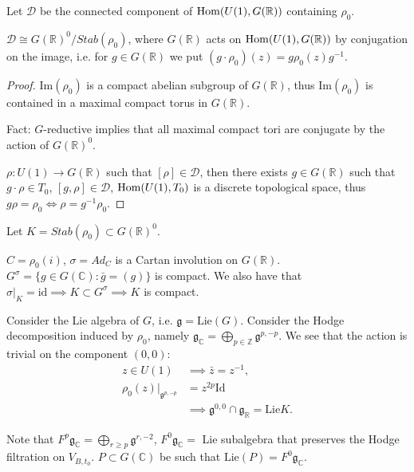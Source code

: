 \begin{definition}
\label{definition-connected-component}
Let $\mathcal{D}$ be the connected component
of
$\mathop{\mathrm{Hom}}\nolimits(U(1),G(\mathbb{R}))$ containing
$\rho_0$.
\end{definition}

\begin{lemma}
\label{lemma-d-orbit}
$\mathcal{D} \cong
G(\mathbb{R})^0/Stab(\rho_0)$,
where $G(\mathbb{R})$ acts on
$\mathop{\mathrm{Hom}}\nolimits(U(1),G(\mathbb{R}))$ by conjugation on
the image,
i.e. for $g \in G(\mathbb{R})$ we put
$(g\cdot \rho_0)(z)=g\rho_0(z)g^{-1}$.
\end{lemma}

\begin{proof}
$\text{Im}(\rho_0)$ is a compact abelian
subgroup
of $G(\mathbb{R})$, thus $\text{Im}(\rho_0)$
is contained in a
maximal compact torus in $G(\mathbb{R})$.

Fact: $G$-reductive implies that all maximal
compact
tori are conjugate by the action of
$G(\mathbb{R})^0$.

$\rho:U(1) \to G(\mathbb{R})$ such that
$[\rho] \in \mathcal{D}$,
then there exists $g \in G(\mathbb{R})$ such
that
$g\cdot\rho \in T_0$,
$[g,\rho]\in \mathcal{D}$,
$\mathop{\mathrm{Hom}}\nolimits(U(1),T_0)$ is a discrete topological
space,
thus $g\rho=\rho_0 \iff \rho=g^{-1}\rho_0$.
\end{proof}

\medskip\noindent
Let $K=Stab(\rho_0)\subset G(\mathbb{R})^0$.

$C=\rho_0(i)$, $\sigma=Ad_C$
is a Cartan involution on $G(\mathbb{R})$.
$G^\sigma = \{g \in
G(\mathbb{C}):\bar{g}=(g)\}$
is compact.
We also have that $\sigma|_K=\text{id}
\implies K\subset G^\sigma
\implies K$ is compact.

Consider the Lie algebra of $G$, i.e.
$\mathfrak{g}=\text{Lie}(G)$.
Consider the Hodge decomposition induced by
$\rho_0$, namely
$\mathfrak{g}_\mathbb{C}=\bigoplus_{p \in
\mathbb{Z}}\mathfrak{g}^{p,-p}$.
We see that the action is trivial on the
component $(0,0)$:
$$
\begin{aligned}
z \in U(1)&\implies \bar{z}=z^{-1},\\
\rho_0(z)|_{\mathfrak{g}^{p,-p}}&=z^{2p}
\text{Id}\\
&\implies \mathfrak{g}^{0,0}\cap
\mathfrak{g}_\mathbb{R}=\text{Lie} K.
\end{aligned}
$$

\noindent
Note that $F^p\mathfrak{g}_\mathbb{C}
=\bigoplus_{r \geq p}\mathfrak{g}^{r,-2}$,
$F^0\mathfrak{g}_\mathbb{C}=$ Lie subalgebra
that preserves the Hodge
filtration on $V_{B,t_0}$.
$P \subset G(\mathbb{C})$ be such that
$\text{Lie}(P)=F^0\mathfrak{g}_\mathbb{C}$.

